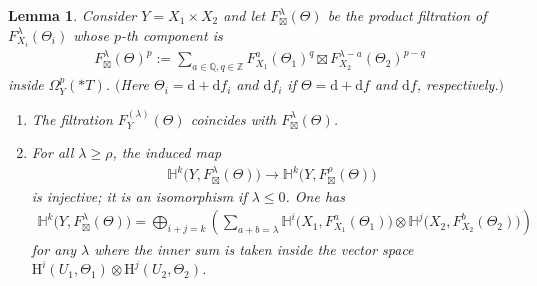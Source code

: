 \documentclass[11pt]{article}
\newcommand{\HH}{\mathbb{H}}
\newcommand{\QQ}{\mathbb{Q}}
\newcommand{\de}{\mathrm{d}}
\newcommand{\coH}{\mathrm{H}}
\newcommand{\ddRH}{\Theta}
\newtheorem*{lemma*}{Lemma}
\begin{document}
\begin{lemma*} Consider $Y = X_1\times X_2$ and let $F_\boxtimes^\lambda(\ddRH)$ be the product filtration of $F_{X_i}^\lambda(\ddRH_i)$ whose $p$-th component is
\begin{gather*} F_\boxtimes^\lambda(\ddRH)^p := \sum_{a\in\QQ, q\in\mathbb{Z}} 	F_{X_1}^a(\ddRH_1)^q \boxtimes F_{X_2}^{\lambda-a}(\ddRH_2)^{p-q} \end{gather*}
inside $\Omega_Y^p(*T)$. $($Here $\ddRH_i = \de+\de f_i$ and $\de f_i$ if $\ddRH = \de+\de f$ and $\de f$, respectively.$)$
\begin{enumerate}\itemsep=0pt
\item The filtration $F_Y^{(\lambda)}(\ddRH)$ coincides with $F_\boxtimes^\lambda(\ddRH)$.
\item For all $\lambda \geq \rho$, the induced map
\begin{gather*} \HH^k\big(Y,F_\boxtimes^\lambda(\ddRH)\big) \to \HH^k\big(Y,F_\boxtimes^\rho(\ddRH)\big) \end{gather*}
is injective; it is an isomorphism if $\lambda\leq 0$. One has
\begin{gather}\label{eq:Kunneth-Y1}
\HH^k\big(Y, F_\boxtimes^\lambda(\ddRH)\big) = \bigoplus_{i+j=k}\left(\sum_{a +b = \lambda} \HH^i\big(X_1,F_{X_1}^a(\ddRH_1)\big)\otimes\HH^j\big(X_2,F^b_{X_2}(\ddRH_2)\big) \right)
\end{gather}
for any $\lambda$ where the inner sum is taken inside the vector space $\coH^i(U_1,\ddRH_1)\otimes \coH^j(U_2,\ddRH_2)$.
\end{enumerate}
\end{lemma*}
\end{document}
